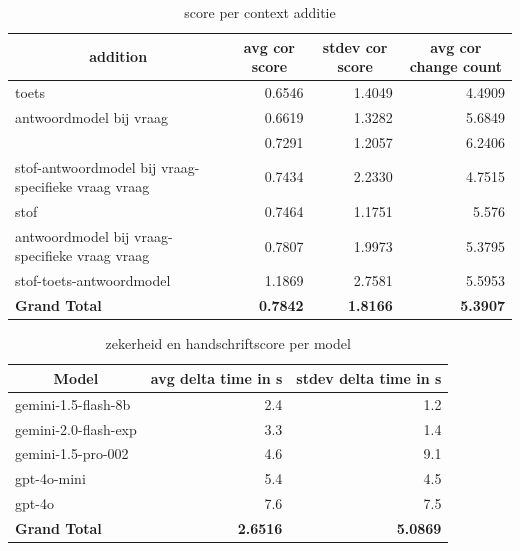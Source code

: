 \documentclass[12pt]{article}
\begin{document}
\noindent\begin{table}[H]
\caption{score per context additie}
\label{fig:score-addition}
\begin{tabularx}{\textwidth}{X *3{r}}
    \toprule
    \multicolumn{1}{c}{\textbf{addition}} & \multicolumn{1}{c}{\textbf{avg cor score}} & \multicolumn{1}{c}{\textbf{stdev cor score}} & \multicolumn{1}{c}{\textbf{avg cor change count}} \\
    \midrule
    toets & 0.6546 & 1.4049 & 4.4909 \\
    antwoordmodel bij vraag & 0.6619 & 1.3282 & 5.6849 \\
    & 0.7291 & 1.2057 & 6.2406 \\
    stof-antwoordmodel bij vraag-specifieke vraag vraag & 0.7434 & 2.2330 & 4.7515 \\
    stof & 0.7464 & 1.1751 & 5.576 \\
    antwoordmodel bij vraag-specifieke vraag vraag & 0.7807 & 1.9973 & 5.3795 \\
    stof-toets-antwoordmodel & 1.1869 & 2.7581 & 5.5953 \\
    \midrule
    \textbf{Grand Total} & \textbf{0.7842} & \textbf{1.8166} & \textbf{5.3907} \\
    \bottomrule
\end{tabularx}%
\end{table}


\noindent\begin{table}[H]
\caption{zekerheid en handschriftscore per model} 
\label{fig:time-model} 
\begin{tabularx}{\textwidth}{X *2{r}}
    \toprule
    \multicolumn{1}{c}{\textbf{Model}} & \multicolumn{1}{c}{\textbf{avg delta time in s}} & \multicolumn{1}{c}{\textbf{stdev delta time in s}} \\
    \midrule
    gemini-1.5-flash-8b & 2.4 & 1.2 \\
    gemini-2.0-flash-exp & 3.3 & 1.4 \\
    gemini-1.5-pro-002 & 4.6 & 9.1 \\
    gpt-4o-mini & 5.4 & 4.5 \\
    gpt-4o & 7.6 & 7.5 \\
    \midrule
    \textbf{Grand Total} & \textbf{2.6516} & \textbf{5.0869} \\
    \bottomrule
\end{tabularx}%
\end{table}
\end{document}
